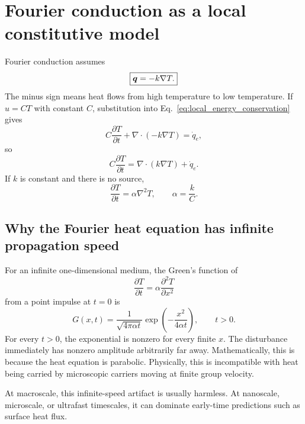 \documentclass[11pt]{article}
\begin{document}
\section{Fourier conduction as a local constitutive model}
Fourier conduction assumes
\begin{equation}
    \boxed{\bm{q}=-k\nabla T.}
    \label{eq:fourier_law}
\end{equation}
The minus sign means heat flows from high temperature to low temperature. If \(u=C T\) with constant \(C\), substitution into Eq.~\eqref{eq:local_energy_conservation} gives
\begin{equation}
    C\frac{\partial T}{\partial t}+\nabla\cdot(-k\nabla T)=\dot{q}_e,
\end{equation}
so
\begin{equation}
    \boxed{C\frac{\partial T}{\partial t}=\nabla\cdot(k\nabla T)+\dot{q}_e.}
    \label{eq:fourier_heat_equation_general}
\end{equation}
If \(k\) is constant and there is no source,
\begin{equation}
    \frac{\partial T}{\partial t}=\alpha \nabla^2T,
    \qquad
    \alpha=\frac{k}{C}.
\end{equation}

\subsection{Why the Fourier heat equation has infinite propagation speed}
For an infinite one-dimensional medium, the Green's function of
\begin{equation}
    \frac{\partial T}{\partial t}=\alpha\frac{\partial^2T}{\partial x^2}
\end{equation}
from a point impulse at \(t=0\) is
\begin{equation}
    G(x,t)=\frac{1}{\sqrt{4\pi\alpha t}}\exp\left(-\frac{x^2}{4\alpha t}\right), \qquad t>0.
\end{equation}
For every \(t>0\), the exponential is nonzero for every finite \(x\). The disturbance immediately has nonzero amplitude arbitrarily far away. Mathematically, this is because the heat equation is parabolic. Physically, this is incompatible with heat being carried by microscopic carriers moving at finite group velocity.

At macroscale, this infinite-speed artifact is usually harmless. At nanoscale, microscale, or ultrafast timescales, it can dominate early-time predictions such as surface heat flux.
\end{document}
